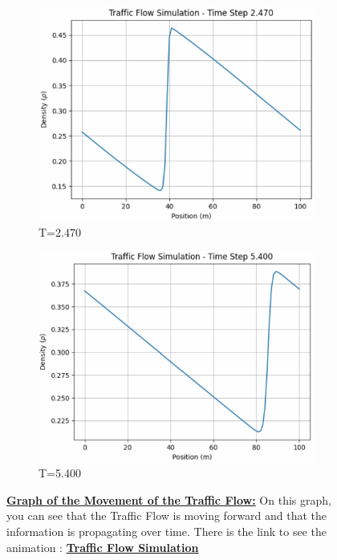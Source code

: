 \documentclass{article}
\begin{document}
\begin{figure}[H]
		\begin{subfigure}{0.4\textwidth}
			\centering
			\includegraphics[width=\textwidth]{AniE3.jpg}
			\caption{T=2.470}
			\label{fig:graph3}
		\end{subfigure}
		\begin{subfigure}{0.4\textwidth}
			\centering
			\includegraphics[width=\textwidth]{AniE4.jpg}
			\caption{T=5.400}
			\label{fig:graph4}
		\end{subfigure}
		\caption[Graph of the Movement of the Traffic Flow]{\textbf{\underline{Graph of the Movement of the Traffic Flow:}} On this graph, you can see that the Traffic Flow is moving forward and that the information is propagating over time. There is the link to see the animation : \href{https://github.com/FlorentGerbaud/Simple-road-traffic-modeling/blob/Flo-PDE/SRTM/EDPMethod/CasTestToLaunch/TestToLaunch/Modele_IC_S/EulerExplicit/traffic_flow_animation.gif}{\textbf{\underline{Traffic Flow Simulation}}}}
		\label{fig:four_graphs}
	\end{figure}
	
\end{document}
